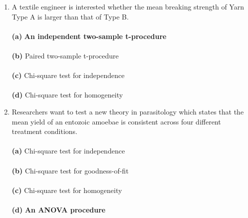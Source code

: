 \documentclass[12pt]{article}
\begin{document}
\begin{enumerate}[leftmargin=\labelsep]
\item A textile engineer is interested whether the mean breaking strength of Yarn Type A is larger than that of Type B. \\ \vspace{1mm}\\
{\bf (a)} \hspace{2mm} {\bf An independent two-sample t-procedure}\\  \vspace{1mm}\\
{\bf (b)} \hspace{2mm} Paired two-sample t-procedure\\   \vspace{1mm}\\
{\bf (c)} \hspace{2mm} Chi-square test for independence\\  \vspace{1mm}\\
{\bf (d)} \hspace{2mm} Chi-square test for homogeneity\\

\item Researchers want to test a new theory in parasitology which states that the mean yield of an entozoic amoebae is consistent across four different treatment conditions.\\ \vspace{1mm}\\
{\bf (a)} \hspace{2mm} Chi-square test for independence\\ \vspace{1mm}\\
{\bf (b)} \hspace{2mm} Chi-square test for goodness-of-fit\\   \vspace{1mm}\\
{\bf (c)} \hspace{2mm} Chi-square test for homogeneity\\  \vspace{1mm}\\
{\bf (d)} \hspace{2mm} {\bf An ANOVA procedure}\\  


\end{enumerate}
\end{document}
